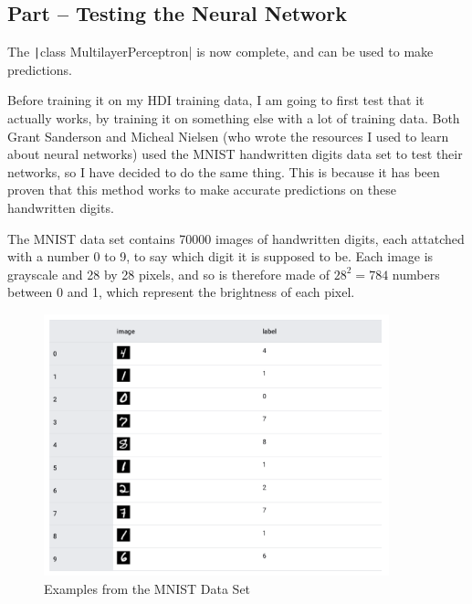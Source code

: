 \documentclass[12pt]{report}
\newcommand{\pil}[1]{\protect\texttt|#1|}
\begin{document}
\begin{center}
\end{center}

\subsection{Part \theparts{} -- Testing the Neural Network}

The \pil{class MultilayerPerceptron} is now complete, and can be used to make predictions.

Before training it on my HDI training data, I am going to first test that it actually works, by training it on something else with a lot of training data. Both Grant Sanderson and Micheal Nielsen (who wrote the resources I used to learn about neural networks) used the MNIST handwritten digits data set to test their networks, so I have decided to do the same thing. This is because it has been proven that this method works to make accurate predictions on these handwritten digits.

The MNIST data set contains 70000 images of handwritten digits, each attatched with a number 0 to 9, to say which digit it is supposed to be. Each image is grayscale and 28 by 28 pixels, and so is therefore made of $28^2=784$ numbers between 0 and 1, which represent the brightness of each pixel.

\begin{figure}[H]
\centering
\includegraphics[width=10cm]{mnistExamples.png}
\caption{Examples from the MNIST Data Set}\label{fig:mnistExamples}
\end{figure}
\end{document}
